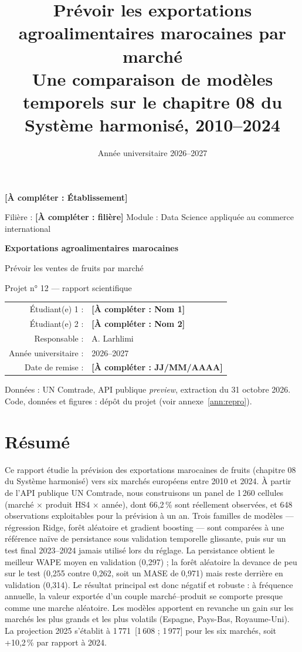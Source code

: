 \documentclass[11pt,a4paper]{article}
\title{\textbf{Prévoir les exportations agroalimentaires marocaines par marché\\[0.3em]
\large Une comparaison de modèles temporels sur le chapitre 08 du Système harmonisé, 2010--2024}}
\author{\todo{Binôme : Nom 1 et Nom 2}}
\date{Année universitaire 2026--2027}
\newcommand{\todo}[1]{\textcolor{blue!60!black}{\textbf{[À compléter : #1]}}}
\newcommand{\MUSD}{\,\text{M USD}}
\begin{document}
\begin{titlepage}
\centering
{\Large \todo{Établissement} \par}
\vspace{0.6cm}
{\large Filière : \todo{filière} \quad Module : Data Science appliquée au commerce international\par}
\vspace{1.6cm}
{\Huge\bfseries Exportations agroalimentaires marocaines\par}
\vspace{0.4cm}
{\LARGE Prévoir les ventes de fruits par marché\par}
\vspace{0.8cm}
{\large Projet n° 12 --- rapport scientifique\par}
\vspace{1.4cm}
\begin{tabular}{rl}
Étudiant(e) 1 : & \todo{Nom 1} \\
Étudiant(e) 2 : & \todo{Nom 2} \\
Responsable : & A. Larhlimi \\
Année universitaire : & 2026--2027 \\
Date de remise : & \todo{JJ/MM/AAAA} \\
\end{tabular}
\vfill
{\small Données : UN Comtrade, API publique \emph{preview}, extraction du 31 octobre 2026.\\
Code, données et figures : dépôt du projet (voir annexe~\ref{ann:repro}).}
\end{titlepage}

\section*{Résumé}

Ce rapport étudie la prévision des exportations marocaines de fruits (chapitre 08
du Système harmonisé) vers six marchés européens entre 2010 et 2024. À partir de
l'API publique UN Comtrade, nous construisons un panel de 1\,260 cellules
(marché $\times$ produit HS4 $\times$ année), dont 66,2\,\% sont réellement
observées, et 648 observations exploitables pour la prévision à un an. Trois
familles de modèles --- régression Ridge, forêt aléatoire et gradient boosting ---
sont comparées à une référence naïve de persistance sous validation temporelle
glissante, puis sur un test final 2023--2024 jamais utilisé lors du réglage.
La persistance obtient le meilleur WAPE moyen en validation (0,297) ; la forêt
aléatoire la devance de peu sur le test (0,255 contre 0,262, soit un MASE de
0,971) mais reste derrière en validation (0,314). Le résultat principal est donc
négatif et robuste : à fréquence annuelle, la valeur exportée d'un couple
marché--produit se comporte presque comme une marche aléatoire. Les modèles
apportent en revanche un gain sur les marchés les plus grands et les plus volatils
(Espagne, Pays-Bas, Royaume-Uni). La projection 2025 s'établit à
1\,771\MUSD{} [1\,608 ; 1\,977] pour les six marchés, soit +10,2\,\% par rapport
à 2024.
\end{document}

